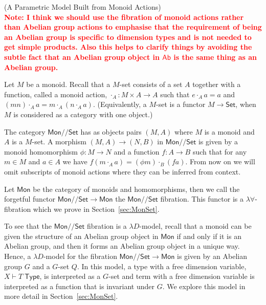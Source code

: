 \documentclass[a4paper,UKenglish]{lipics}
\newcommand\note[1]{{ \bf \textcolor{red} {\vspace{2mm}\; \\ Note: #1\\}}}
\newcommand{\msf}[1]{\mathsf{#1}} %
\newcommand{\Mon}{\msf{Mon}}
\newcommand{\Ab}{\msf{Ab}}
\newcommand{\Set}{\msf{Set}}
\newcommand{\GroupSet}[1]{#1/\!/\Set}
\newcommand{\MonSet}{\GroupSet{\Mon}}
\newcommand{\Tj}[2]{#1 \vdash #2 \; \msf{ Type}}
\newcommand{\Dvar}{X}
\begin{document}
\begin{example}(A Parametric Model Built from Monoid Actions)
\note{I think we should use the fibration of monoid actions rather than Abelian group actions to emphasise that the requirement of being an Abelian group is specific to dimension types and is not needed to get simple products. Also this helps to clarify things by avoiding the subtle fact that an Abelian group object in $\Ab$ is the same thing as an Abelian group.}

Let $M$ be a monoid. Recall that a $M$-set consists of a set $A$ together with a function, called a monoid action, $\cdot_A:M\times A\to A$ such that $e\cdot_{A} a=a$ and $(mn)\cdot_A a=m\cdot_A (n\cdot_A a)$. (Equivalently, a $M$-set is a functor $M\to\Set$, when $M$ is considered as a category with one object.)

The category $\MonSet$ has as objects pairs $(M,A)$ where $M$ is a monoid and $A$ is a $M$-set. A morphism $(M,A) \rightarrow (N,B)$ in $\MonSet$ is given by a monoid homomorphism $\phi:M\rightarrow N$ and a function $f:A \rightarrow B$ such that for any $m\in M$ and $a\in A$ we have $f (m\cdot_A a) = (\phi m)\cdot_B (f a)$. From now on we will omit subscripts of monoid actions where they can be inferred from context.

Let $\Mon$ be the category of monoids and homomorphisms, then we call the forgetful functor $\MonSet\to \Mon$ the $\MonSet$ fibration. This functor is a $\lambda\forall$-fibration which we prove in Section~\ref{sec:MonSet}.

To see that the $\MonSet$ fibration is a $\lambda D$-model, recall that a monoid can be given the structure of an Abelian group object in $\Mon$ if and only if it is an Abelian group, and then it forms an Abelian group object in a unique way. Hence, a $\lambda D$-model for the fibration $\MonSet\to\Mon$ is given by an Abelian group $G$ and a $G$-set $Q$. In this model, a type with a free dimension variable, $\Tj\Dvar T$, is interpreted as a $G$-set and term with a free dimension variable is interpreted as a function that is invariant under $G$. We explore this model in more detail in Section~\ref{sec:MonSet}.
\end{example}
\end{document}
